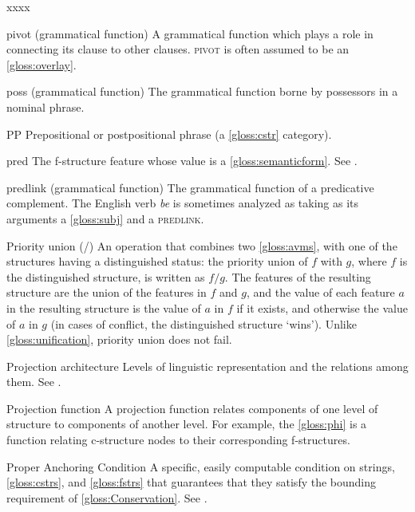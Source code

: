 \documentclass[output=paper,colorlinks,citecolor=brown]{langscibook}
\begin{document}
\begin{labeling}{xxxx}
\item[pivot] (grammatical function) A grammatical function which plays a role in connecting its clause to other clauses.  \textsc{pivot} is often assumed to be an \ref{gloss:overlay}.

\item[poss] (grammatical function) The grammatical function borne by possessors in a nominal phrase.

\item[PP\namedlabel{gloss:PP}{PP}] Prepositional or postpositional phrase (a \ref{gloss:cstr} category).

\item[pred\namedlabel{gloss:PRED}{\textsc{pred}}] The f-structure feature whose value is a \ref{gloss:semanticform}. See \citetv[\ref{sect:pred}]{chapters/CoreConcepts}.

\item[predlink] (grammatical function) The grammatical function of a predicative complement.  The English verb \emph{be} is sometimes analyzed as taking as its arguments a \ref{gloss:subj} and a \textsc{predlink}.

\item[Priority union (/)] An operation that combines two \ref{gloss:avms}, with one of the structures having a distinguished status: the priority union of $f$ with $g$, where $f$ is the distinguished structure, is written as $f/g$.  The features of the resulting structure are the union of the features in $f$ and $g$, and the value of each feature $a$ in the resulting structure is the value of $a$ in $f$ if it exists, and otherwise the value of $a$ in $g$ (in cases of conflict, the distinguished structure `wins').  Unlike \ref{gloss:unification}, priority union does not fail.

\item[Projection architecture] Levels of linguistic representation and the relations among them.  See \citetv[\ref{sect:intro:addlevels}]{chapters/Intro}.

\item[Projection\namedlabel{gloss:projection}{projection} function] A projection function relates components of one level of structure to components of another level.  For example, the \ref{gloss:phi} is a function relating c-structure nodes to their corresponding f-structures.

\item[Proper Anchoring Condition\namedlabel{gloss:PAC}{Proper Anchoring Condition}] A specific, easily computable condition on strings, \ref{gloss:cstrs}, and \ref{gloss:fstrs} that guarantees that they satisfy the bounding requirement of \ref{gloss:Conservation}. See .


\end{labeling}
\end{document}
